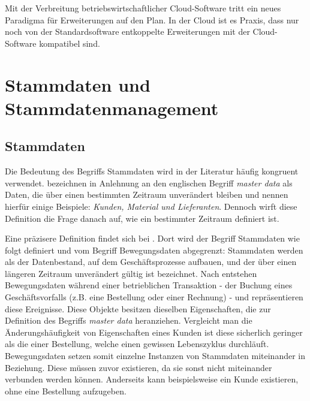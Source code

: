 Mit der Verbreitung betriebswirtschaftlicher Cloud-Software tritt ein neues Paradigma für Erweiterungen auf den Plan. In der Cloud ist es Praxis, dass nur noch von der Standardsoftware entkoppelte Erweiterungen mit der Cloud-Software kompatibel sind.
\autocite{Schneider.2018}
% 
% 
% 
% 
% 
% 
\section{Stammdaten und Stammdatenmanagement}

\subsection{Stammdaten}
Die Bedeutung des Begriffs Stammdaten wird in der Literatur häufig kongruent verwendet. \citeauthor{alex65937} bezeichnen in Anlehnung an \citeauthor{Rosenberg.1987} den englischen Begriff \textit{master data} als Daten, die über einen bestimmten Zeitraum unverändert bleiben und nennen hierfür einige Beispiele: \textit{Kunden, Material und Lieferanten}. Dennoch wirft diese Definition die Frage danach auf, wie ein bestimmter Zeitraum definiert ist.
\autocite{alex65937}
\autocite{Rosenberg.1987}

Eine präzisere Definition findet sich bei \citeauthor{Hildebrand.2008}. Dort wird der Begriff Stammdaten wie folgt definiert und vom Begriff Bewegungsdaten abgegrenzt: Stammdaten werden als der Datenbestand, auf dem Geschäftsprozesse aufbauen, und der über einen längeren Zeitraum unverändert gültig ist bezeichnet. Nach \citeauthor{Hildebrand.2008} entstehen Bewegungsdaten während einer betrieblichen Transaktion - der Buchung eines Geschäftsvorfalls (z.B. eine Bestellung oder einer Rechnung) - und repräsentieren diese Ereignisse. 
\autocite{Hildebrand.2008} 
Diese Objekte besitzen dieselben Eigenschaften, die \citeauthor{alex65937} zur Definition des Begriffs \textit{master data} heranziehen. Vergleicht man die Änderungshäufigkeit von Eigenschaften eines Kunden ist diese sicherlich geringer als die einer Bestellung, welche einen gewissen Lebenszyklus durchläuft. Bewegungsdaten setzen somit einzelne Instanzen von Stammdaten miteinander in Beziehung. Diese müssen zuvor existieren, da sie sonst nicht miteinander verbunden werden können. Anderseits kann beispielsweise ein Kunde existieren, ohne eine Bestellung aufzugeben. 
\autocite{Hildebrand.2008} 

